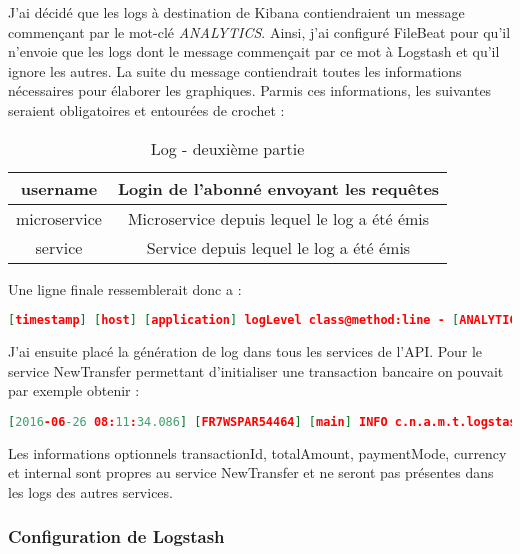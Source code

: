 	J'ai décidé que les logs à destination de Kibana contiendraient un message commençant par le mot-clé \textit{ANALYTICS}. Ainsi, j'ai configuré FileBeat pour qu'il n'envoie que les logs dont le message commençait par ce mot à Logstash et qu'il ignore les autres. La suite du message contiendrait toutes les informations nécessaires pour élaborer les graphiques. Parmis ces informations, les suivantes seraient obligatoires et entourées de crochet :
	
	\begin{table}[h!]
	\center
	\begin{tabular}{| c | c |}
     \hline
     username & Login de l'abonné envoyant les requêtes \\ \hline
     microservice & Microservice depuis lequel le log a été émis \\ \hline
     service & Service depuis lequel le log a été émis \\
     \hline
	\end{tabular}
	\caption{Log - deuxième partie}
	\end{table}
	
	Une ligne finale ressemblerait donc a :
	
\begin{lstlisting}[language=json]
 [timestamp] [host] [application] logLevel class@method:line - [ANALYTICS] [username] [microservice] [service] info1=valeur1 info2=valeur2 ... infoN=valeurN 
\end{lstlisting}
	
	J'ai ensuite placé la génération de log dans tous les services de l'API. Pour le service NewTransfer permettant d'initialiser une transaction bancaire on pouvait par exemple obtenir :
	
\begin{lstlisting}[language=json]
[2016-06-26 08:11:34.086] [FR7WSPAR54464] [main] INFO c.n.a.m.t.logstash.LogStashTests@testNewTransfer:36 - [ANALYTICS] [COCKZAO72] [Transaction] [NewTransfer] transactionId=13072409724 totalAmount=1000 paymentMode=SINGLE currency=EUR internal=true
\end{lstlisting}

	Les informations optionnels transactionId, totalAmount, paymentMode, currency et internal sont propres au service NewTransfer et ne seront pas présentes dans les logs des autres services. 
	
	\subsubsection{Configuration de Logstash}
	
